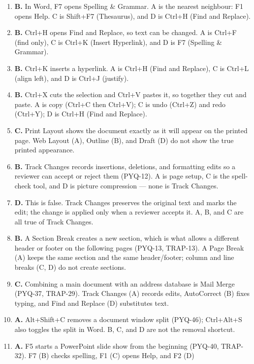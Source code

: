 \begin{enumerate}[label=\textbf{Q\arabic*.}, leftmargin=*]
\item \textbf{B.} In Word, F7 opens Spelling \& Grammar. A is the nearest
  neighbour: F1 opens Help. C is Shift+F7 (Thesaurus), and D is Ctrl+H (Find
  and Replace).
\item \textbf{B.} Ctrl+H opens Find and Replace, so text can be changed. A is
  Ctrl+F (find only), C is Ctrl+K (Insert Hyperlink), and D is F7 (Spelling
  \& Grammar).
\item \textbf{B.} Ctrl+K inserts a hyperlink. A is Ctrl+H (Find and Replace),
  C is Ctrl+L (align left), and D is Ctrl+J (justify).
\item \textbf{B.} Ctrl+X cuts the selection and Ctrl+V pastes it, so together
  they cut and paste. A is copy (Ctrl+C then Ctrl+V); C is undo
  (Ctrl+Z) and redo (Ctrl+Y); D is Ctrl+H (Find and Replace).
\item \textbf{C.} Print Layout shows the document exactly as it will appear on
  the printed page. Web Layout (A), Outline (B), and Draft (D) do not show the
  true printed appearance.
\item \textbf{B.} Track Changes records insertions, deletions, and formatting
  edits so a reviewer can accept or reject them (PYQ-12). A is page setup, C
  is the spell-check tool, and D is picture compression --- none is Track
  Changes.
\item \textbf{D.} This is false. Track Changes preserves the original text and
  marks the edit; the change is applied only when a reviewer accepts it. A, B,
  and C are all true of Track Changes.
\item \textbf{B.} A Section Break creates a new section, which is what allows a
  different header or footer on the following pages (PYQ-13, TRAP-13). A Page
  Break (A) keeps the same section and the same header/footer; column and line
  breaks (C, D) do not create sections.
\item \textbf{C.} Combining a main document with an address database is Mail
  Merge (PYQ-37, TRAP-29). Track Changes (A) records edits, AutoCorrect (B)
  fixes typing, and Find and Replace (D) substitutes text.
\item \textbf{A.} Alt+Shift+C removes a document window split (PYQ-46);
  Ctrl+Alt+S also toggles the split in Word. B, C, and D are not the removal
  shortcut.
\item \textbf{A.} F5 starts a PowerPoint slide show from the beginning
  (PYQ-40, TRAP-32). F7 (B) checks spelling, F1 (C) opens Help, and F2 (D)

\end{enumerate}
